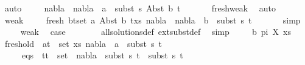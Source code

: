\begin{isabellebody}
\ auto\isanewline
\ \ \ \isamarkupfalse%
\ {\isachardoublequoteopen}{\isacharparenleft}{\kern0pt}nabla{}\ {\isasymunion}\ nabla{}{\isacharparenright}{\kern0pt}\ {\isasymturnstile}\ a\ {\isasymsharp}\ subst\ s{}\ {\isacharparenleft}{\kern0pt}Abst\ b\ t{\isacharprime}{\kern0pt}{\isacharparenright}{\kern0pt}{\isachardoublequoteclose}\isanewline
\ \ \ \ \ \isamarkupfalse%
\ fresh{\isacharunderscore}{\kern0pt}weak\ \isamarkupfalse%
\ auto\isanewline
\ \ \ \isamarkupfalse%
\ weak{}\isanewline
\ \ \ \isamarkupfalse%
\ fresh{\isacharcolon}{\kern0pt}\ {\isachardoublequoteopen}{\isasymforall}{\isacharparenleft}{\kern0pt}b{\isacharcomma}{\kern0pt}t{\isacharparenright}{\kern0pt}{\isasymin}set\ {\isacharparenleft}{\kern0pt}{\isacharparenleft}{\kern0pt}a{\isacharcomma}{\kern0pt}\ Abst\ b\ t{\isacharprime}{\kern0pt}{\isacharparenright}{\kern0pt}{\isacharhash}{\kern0pt}xs{\isacharparenright}{\kern0pt}{\isachardot}{\kern0pt}\ {\isacharparenleft}{\kern0pt}nabla{}\ {\isasymunion}\ nabla{}{\isacharparenright}{\kern0pt}\ {\isasymturnstile}\ b\ {\isasymsharp}\ subst\ s{}\ t{\isachardoublequoteclose}\isanewline
\ \ \ \ \ \isamarkupfalse%
\ simp\isanewline
\ \ \ \isamarkupfalse%
\ weak{}{\isacharparenleft}{\kern0pt}{}{\isacharparenright}{\kern0pt}\ \isamarkupfalse%
\ {\isacharquery}{\kern0pt}case\ \isanewline
\ \ \ \ \ \isamarkupfalse%
\ all{\isacharunderscore}{\kern0pt}solutions{\isacharunderscore}{\kern0pt}def\ ext{\isacharunderscore}{\kern0pt}subst{\isacharunderscore}{\kern0pt}def\ \isamarkupfalse%
\ simp\isanewline
{}\isamarkupfalse%
\isanewline
\ \ \isamarkupfalse%
\ {\isacharparenleft}{\kern0pt}{}\ b\ pi\ X\ xs{\isacharparenright}{\kern0pt}\isanewline
\ \ \isamarkupfalse%
\ fresh{\isacharunderscore}{\kern0pt}old{\isacharcolon}{\kern0pt}\ {\isachardoublequoteopen}{\isasymforall}\ {\isacharparenleft}{\kern0pt}a{\isacharcomma}{\kern0pt}t{\isacharparenright}{\kern0pt}\ {\isasymin}\ set\ xs{\isachardot}{\kern0pt}\ nabla{}\ {\isasymturnstile}\ a\ {\isasymsharp}\ subst\ s{}\ t{\isachardoublequoteclose}\isanewline
\ \ \ \ \ eqs{\isacharcolon}{\kern0pt}\ {\isachardoublequoteopen}{\isasymforall}\ {\isacharparenleft}{\kern0pt}t{}{\isacharcomma}{\kern0pt}t{}{\isacharparenright}{\kern0pt}\ {\isasymin}\ set\ {\isacharbrackleft}{\kern0pt}{\isacharbrackright}{\kern0pt}{\isachardot}{\kern0pt}\ nabla{}\ {\isasymturnstile}\ subst\ s{}\ t{}\ {\isasymapprox}\ subst\ s{}\ t{}{\isachardoublequoteclose}\isanewline

\end{isabellebody}
